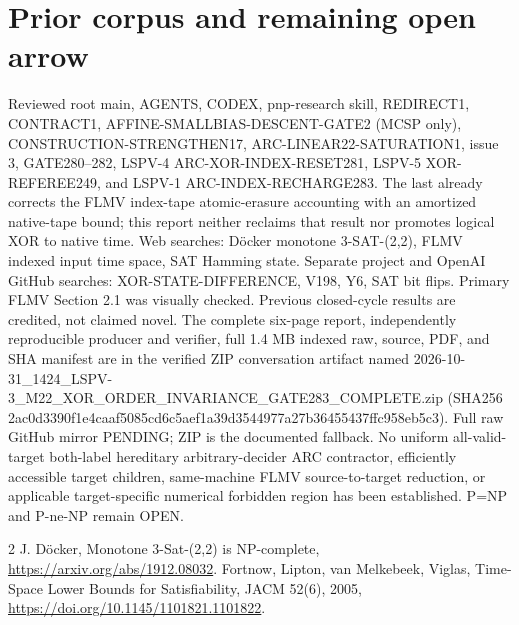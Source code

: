 \documentclass{article}
\begin{document}
\section{Prior corpus and remaining open arrow}
Reviewed root main, AGENTS, CODEX, pnp-research skill, REDIRECT1, CONTRACT1, AFFINE-SMALLBIAS-DESCENT-GATE2 (MCSP only), CONSTRUCTION-STRENGTHEN17, ARC-LINEAR22-SATURATION1, issue 3, GATE280--282, LSPV-4 ARC-XOR-INDEX-RESET281, LSPV-5 XOR-REFEREE249, and LSPV-1 ARC-INDEX-RECHARGE283. The last already corrects the FLMV index-tape atomic-erasure accounting with an amortized native-tape bound; this report neither reclaims that result nor promotes logical XOR to native time. Web searches: D\"ocker monotone 3-SAT-(2,2), FLMV indexed input time space, SAT Hamming state. Separate project and OpenAI GitHub searches: XOR-STATE-DIFFERENCE, V198, Y6, SAT bit flips. Primary FLMV Section 2.1 was visually checked. Previous closed-cycle results are credited, not claimed novel.
The complete six-page report, independently reproducible producer and verifier, full 1.4 MB indexed raw, source, PDF, and SHA manifest are in the verified ZIP conversation artifact named 2026-10-31_1424_LSPV-3_M22_XOR_ORDER_INVARIANCE_GATE283_COMPLETE.zip (SHA256 2ac0d3390f1e4caaf5085cd6c5aef1a39d3544977a27b36455437ffc958eb5c3). Full raw GitHub mirror PENDING; ZIP is the documented fallback.
No uniform all-valid-target both-label hereditary arbitrary-decider ARC contractor, efficiently accessible target children, same-machine FLMV source-to-target reduction, or applicable target-specific numerical forbidden region has been established. P=NP and P-ne-NP remain OPEN.
\begin{thebibliography}{2}
 J. D\"ocker, Monotone 3-Sat-(2,2) is NP-complete, \url{https://arxiv.org/abs/1912.08032}.
 Fortnow, Lipton, van Melkebeek, Viglas, Time-Space Lower Bounds for Satisfiability, JACM 52(6), 2005, \url{https://doi.org/10.1145/1101821.1101822}.
\end{thebibliography}
\end{document}
